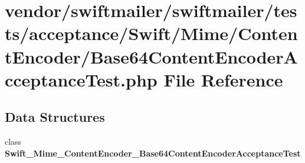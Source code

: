 \section{vendor/swiftmailer/swiftmailer/tests/acceptance/\+Swift/\+Mime/\+Content\+Encoder/\+Base64\+Content\+Encoder\+Acceptance\+Test.php File Reference}
\label{_base64_content_encoder_acceptance_test_8php}
\subsection*{Data Structures}
\begin{DoxyCompactItemize}
\item 
class {\bf Swift\+\_\+\+Mime\+\_\+\+Content\+Encoder\+\_\+\+Base64\+Content\+Encoder\+Acceptance\+Test}
\end{DoxyCompactItemize}

